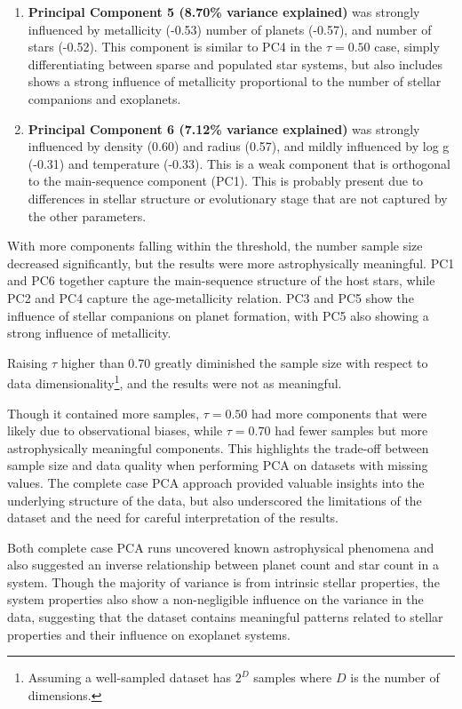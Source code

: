 \documentclass[preprint]{aastex631}
\begin{document}
\begin{enumerate}
  \item \textbf{Principal Component 5 (8.70\% variance explained)} was strongly influenced by metallicity (-0.53) number of planets (-0.57), and number of stars (-0.52). This component is similar to PC4 in the $\tau=0.50$ case, simply differentiating between sparse and populated star systems, but also includes shows a strong influence of metallicity proportional to the number of stellar companions and exoplanets.
  \item \textbf{Principal Component 6 (7.12\% variance explained)} was strongly influenced by density (0.60) and radius (0.57), and mildly influenced by log g (-0.31) and temperature (-0.33). This is a weak component that is orthogonal to the main-sequence component (PC1). This is probably present due to differences in stellar structure or evolutionary stage that are not captured by the other parameters.
\end{enumerate}

With more components falling within the threshold, the number sample size decreased significantly, but the results were more astrophysically meaningful. PC1 and PC6 together capture the main-sequence structure of the host stars, while PC2 and PC4 capture the age-metallicity relation. PC3 and PC5 show the influence of stellar companions on planet formation, with PC5 also showing a strong influence of metallicity.

Raising $\tau$ higher than 0.70 greatly diminished the sample size with respect to data dimensionality\footnote{Assuming a well-sampled dataset has $2^D$ samples where $D$ is the number of dimensions.}, and the results were not as meaningful.

Though it contained more samples, $\tau=0.50$ had more components that were likely due to observational biases, while $\tau=0.70$ had fewer samples but more astrophysically meaningful components. This highlights the trade-off between sample size and data quality when performing PCA on datasets with missing values. The complete case PCA approach provided valuable insights into the underlying structure of the data, but also underscored the limitations of the dataset and the need for careful interpretation of the results.

Both complete case PCA runs uncovered known astrophysical phenomena and also suggested an inverse relationship between planet count and star count in a system. Though the majority of variance is from intrinsic stellar properties, the system properties also show a non-negligible influence on the variance in the data, suggesting that the dataset contains meaningful patterns related to stellar properties and their influence on exoplanet systems.
\end{document}
